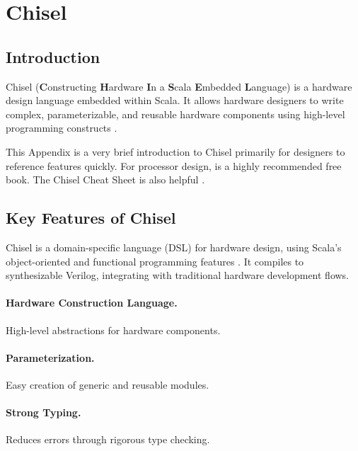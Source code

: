\section{Chisel} \label{app:chisel}


\subsection{Introduction}
Chisel (\textbf{C}onstructing \textbf{H}ardware \textbf{I}n a \textbf{S}cala \textbf{E}mbedded \textbf{L}anguage) is a hardware design language embedded within Scala. It allows hardware designers to write complex, parameterizable, and reusable hardware components using high-level programming constructs \cite{bachrach2012chisel}. 

This Appendix is a very brief introduction to Chisel primarily for designers to reference features quickly. For processor design, \citep{chisel:book} is a highly recommended free book. The Chisel Cheat Sheet is also helpful \cite{chiselcheatsheet}.

\subsection{Key Features of Chisel}
Chisel is a domain-specific language (DSL) for hardware design, using Scala's object-oriented and functional programming features \cite{chisel-doc}. It compiles to synthesizable Verilog, integrating with traditional hardware development flows.

\paragraph{Hardware Construction Language.} High-level abstractions for hardware components.
\paragraph{Parameterization.} Easy creation of generic and reusable modules.
\paragraph{Strong Typing.} Reduces errors through rigorous type checking.
